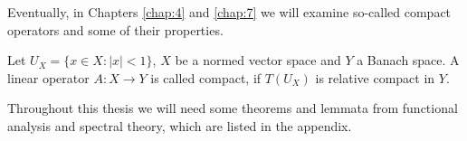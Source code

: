 Eventually, in Chapters \ref{chap:4} and \ref{chap:7} we will examine so-called compact operators and some of their properties.

\begin{definition}
	Let $U_{X} = \{ x \in X \colon |x| < 1 \}$, $X$ be a normed vector space and $Y$ a Banach space. A linear operator $A \colon X \rightarrow Y$ is called compact, if $T(U_{X})$ is relative compact in $Y$.
\end{definition}

Throughout this thesis we will need some theorems and lemmata from functional analysis and spectral theory, which are listed in the appendix.